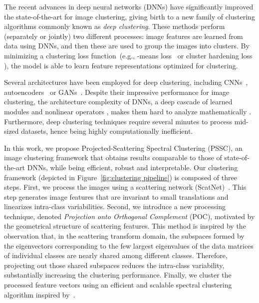 \documentclass[11pt]{article}
\theoremstyle{definition}
\newcommand{\Figure}[1]{Figure~\ref{#1}}
\begin{document}
The recent advances in deep neural networks (DNNs) \cite{Lecun_CNNsVision_2010, Krizhevsky_Alexnet_2012, Zisserman_VGG_2014, He_DeepResidualLearningResNet_2016} have significantly improved the state-of-the-art for image clustering, giving birth to a new family of clustering algorithms commonly known as \textit{deep clustering}. These methods perform (separately or jointly) two different processes: image features are learned from data using DNNs, and then these are used to group the images into clusters. By minimizing a clustering loss function~(e.g., -means loss~\cite{Yang_TowrdsKMeansFriendlySpacesDeepClustering_2017} or cluster hardening loss \cite{Xie_UnsupervisedDeepEmbeddingClustering_2016}), the model is able to learn feature representations optimized for clustering.

Several architectures have been employed for deep clustering, including CNNs~\cite{Caron_DeepClusteringUnsupervisedLearningVisualFeatures_2018, Yang_JointUnsupervisedLearningImageClusters_2016joint}, autoencoders~\cite{Mcconville_DeepClusteringManifoldAutoencodedEmbedding_2019, Guo_DeepClusteringConvolutionalAutoencoders_2017, Ren_DeepDensityBasedClustering_2020, Yang_TowrdsKMeansFriendlySpacesDeepClustering_2017} or GANs~\cite{Donahue_AdversarialFeatureLearning_2016, Mrabah_AdversarialDeepEmbeddedClustering_2020}. Despite their impressive performance for image clustering, the architecture complexity of DNNs, a deep cascade of learned modules and nonlinear operators \cite{Lecun_CNNsVision_2010}, makes them hard to analyze mathematically \cite{Szegedy_IntriguingPropertiesNeuralNetworks_2013, Mallat_UnderstandingDeepNetworks_2016, Zhang_RethinkingGeneralization_2016}. Furthermore, deep clustering techniques require several minutes to process mid-sized datasets, hence being highly computationally inefficient.

In this work, we propose Projected-Scattering Spectral Clustering (PSSC), an image clustering framework that obtains results comparable to those of state-of-the-art DNNs, while being efficient, robust and interpretable. Our clustering framework (depicted in \Figure{fig:clustering pipeline}) is composed of three steps. First, we process the images using a scattering network (ScatNet)~\cite{Bruna_InvariantScattering_2012}. This step generates image features that are invariant to small translations and linearizes intra-class variabilities. Second, we introduce a new processing technique, denoted \textit{Projection onto Orthogonal Complement} (POC), motivated by the geometrical structure of scattering features.
This method is inspired by the observation that, in the scattering transform domain, the subspaces formed by the eigenvectors corresponding to the few largest eigenvalues  of the data matrices of individual classes are nearly shared among different classes. 
Therefore, projecting out those shared subspaces reduces the intra-class variability, substantially increasing the clustering performance.
Finally, we cluster the processed feature vectors using an efficient and scalable spectral clustering algorithm inspired by~\cite{Huang_UltraScalableSpectralClustering_2019}.  
\end{document}

